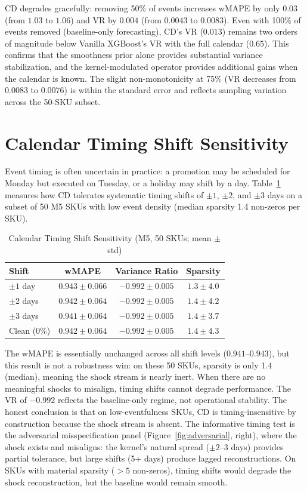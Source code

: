 \documentclass[10pt]{article} %
\theoremstyle{plain}
\theoremstyle{definition}
\begin{document}
CD degrades gracefully: removing 50\% of events increases wMAPE by only $0.03$ (from $1.03$ to $1.06$) and VR by $0.004$ (from $0.0043$ to $0.0083$). Even with 100\% of events removed (baseline-only forecasting), CD's VR ($0.013$) remains two orders of magnitude below Vanilla XGBoost's VR with the full calendar ($0.65$). This confirms that the smoothness prior alone provides substantial variance stabilization, and the kernel-modulated operator provides additional gains when the calendar is known. The slight non-monotonicity at 75\% (VR decreases from $0.0083$ to $0.0076$) is within the standard error and reflects sampling variation across the 50-SKU subset.


\section{Calendar Timing Shift Sensitivity}
\label{app:timing}

Event timing is often uncertain in practice: a promotion may be scheduled for Monday but executed on Tuesday, or a holiday may shift by a day. Table~\ref{tab:timing_shift} measures how CD tolerates systematic timing shifts of $\pm 1$, $\pm 2$, and $\pm 3$ days on a subset of 50 M5 SKUs with low event density (median sparsity 1.4 non-zeros per SKU).

\begin{table}[ht]
\centering
\small
\caption{Calendar Timing Shift Sensitivity (M5, 50 SKUs; mean $\pm$ std)}
\label{tab:timing_shift}
\begin{tabular}{@{}lccc@{}}
\toprule
Shift & wMAPE & Variance Ratio & Sparsity \\
\midrule
$\pm 1$ day & $0.943 \pm 0.066$ & $-0.992 \pm 0.005$ & $1.3 \pm 4.0$ \\
$\pm 2$ days & $0.942 \pm 0.064$ & $-0.992 \pm 0.005$ & $1.4 \pm 4.2$ \\
$\pm 3$ days & $0.941 \pm 0.064$ & $-0.992 \pm 0.005$ & $1.4 \pm 3.7$ \\
Clean (0\%) & $0.942 \pm 0.064$ & $-0.992 \pm 0.005$ & $1.4 \pm 4.3$ \\
\bottomrule
\end{tabular}
\end{table}

The wMAPE is essentially unchanged across all shift levels ($0.941$--$0.943$), but this result is not a robustness win: on these 50 SKUs, sparsity is only 1.4 (median), meaning the shock stream is nearly inert. When there are no meaningful shocks to misalign, timing shifts cannot degrade performance. The VR of $-0.992$ reflects the baseline-only regime, not operational stability. The honest conclusion is that on low-eventfulness SKUs, CD is timing-insensitive by construction because the shock stream is absent. The informative timing test is the adversarial misspecification panel (Figure~\ref{fig:adversarial}, right), where the shock exists and misaligns: the kernel's natural spread ($\pm 2$--$3$ days) provides partial tolerance, but large shifts (5+ days) produce lagged reconstructions. On SKUs with material sparsity ($>5$ non-zeros), timing shifts would degrade the shock reconstruction, but the baseline would remain smooth.
\end{document}
